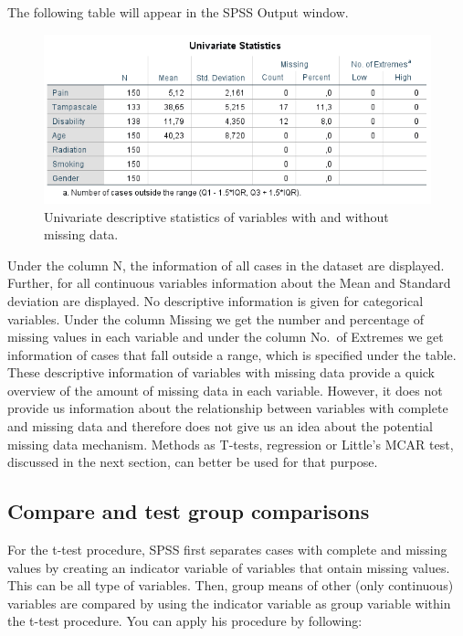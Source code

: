 \documentclass[
]{book}
\begin{document}
The following table will appear in the SPSS Output window.

\begin{figure}

{\centering \includegraphics[width=0.9\linewidth]{images/tab2.4} 

}

\caption{Univariate descriptive statistics of variables with and without missing data.}\label{fig:tab2-4}
\end{figure}

Under the column N, the information of all cases in the dataset are displayed. Further, for all continuous variables information about the Mean and Standard deviation are displayed. No descriptive information is given for categorical variables. Under the column Missing we get the number and percentage of missing values in each variable and under the column No.~of Extremes we get information of cases that fall outside a range, which is specified under the table. These descriptive information of variables with missing data provide a quick overview of the amount of missing data in each variable. However, it does not provide us information about the relationship between variables with complete and missing data and therefore does not give us an idea about the potential missing data mechanism. Methods as T-tests, regression or Little's MCAR test, discussed in the next section, can better be used for that purpose.

\hypertarget{compare-and-test-group-comparisons}{%
\subsection{Compare and test group comparisons}\label{compare-and-test-group-comparisons}}

For the t-test procedure, SPSS first separates cases with complete and missing values by creating an indicator variable of variables that ontain missing values. This can be all type of variables. Then, group means of other (only continuous) variables are compared by using the indicator variable as group variable within the t-test procedure. You can apply his procedure by following:
\end{document}
